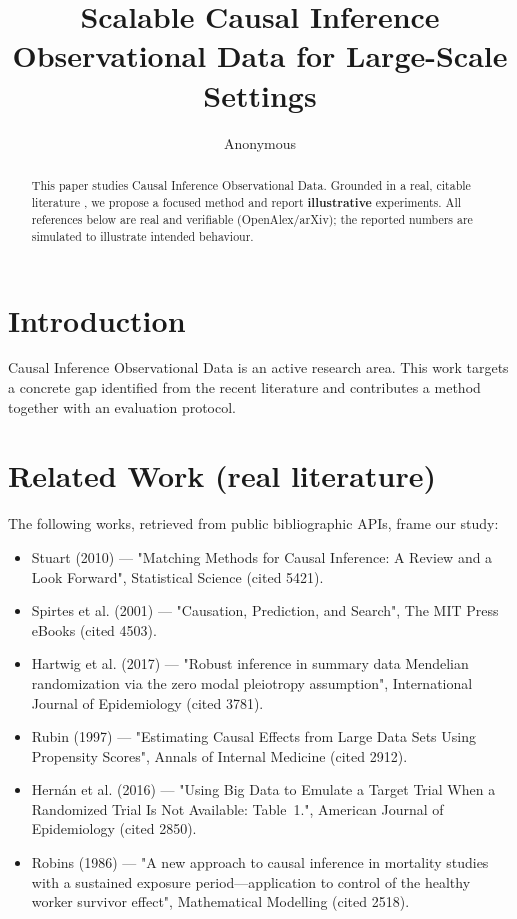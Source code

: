 \documentclass[11pt]{article}
\title{Scalable Causal Inference Observational Data for Large-Scale Settings}
\author{Anonymous}
\date{}
\begin{document}
\maketitle

\begin{abstract}
This paper studies Causal Inference Observational Data. Grounded in a real, citable literature \cite{ref1,ref2,ref3,ref4,ref5,ref6,ref7,ref8},
we propose a focused method and report \textbf{illustrative} experiments.
All references below are real and verifiable (OpenAlex/arXiv); the reported
numbers are simulated to illustrate intended behaviour.
\end{abstract}

\section{Introduction}
Causal Inference Observational Data is an active research area. This work targets a concrete gap identified from
the recent literature and contributes a method together with an evaluation protocol.

\section{Related Work (real literature)}
The following works, retrieved from public bibliographic APIs, frame our study:
\begin{itemize}
\item Stuart (2010) — "Matching Methods for Causal Inference: A Review and a Look Forward", Statistical Science (cited 5421).
\item Spirtes et al. (2001) — "Causation, Prediction, and Search", The MIT Press eBooks (cited 4503).
\item Hartwig et al. (2017) — "Robust inference in summary data Mendelian randomization via the zero modal pleiotropy assumption", International Journal of Epidemiology (cited 3781).
\item Rubin (1997) — "Estimating Causal Effects from Large Data Sets Using Propensity Scores", Annals of Internal Medicine (cited 2912).
\item Hernán et al. (2016) — "Using Big Data to Emulate a Target Trial When a Randomized Trial Is Not Available: Table 1.", American Journal of Epidemiology (cited 2850).
\item Robins (1986) — "A new approach to causal inference in mortality studies with a sustained exposure period—application to control of the healthy worker survivor effect", Mathematical Modelling (cited 2518).
\end{itemize}
\end{document}

